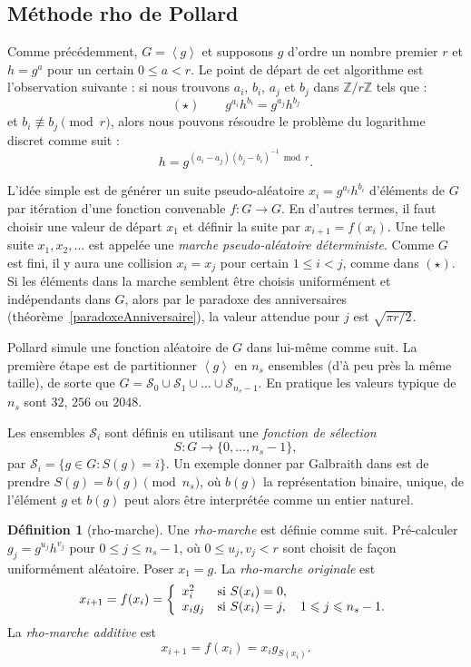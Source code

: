 \documentclass[a4paper, titlepage]{article}
\theoremstyle{definition}
\newtheorem{defi}[theo]{Définition}
\theoremstyle{remark}
\def\Z{\mathbb Z}
\def\gen #1{\left\langle#1\right\rangle}
\begin{document}
\subsection{Méthode rho de Pollard}

Comme précédemment, $G = \gen{g}$ et supposons $g$ d'ordre un nombre premier $r$ et $h = g^a$ pour un certain $0 \leqslant a < r$. Le point de départ de cet algorithme est l'observation suivante : si nous trouvons $a_i$, $b_i$, $a_j$ et $b_j$ dans $\Z/r\Z$ tels que :
$$(\star) \qquad g^{a_i}h^{b_i} = g^{a_j}h^{b_j}$$
et $b_i \not\equiv b_j \pmod{r}$, alors nous pouvons résoudre le problème du logarithme discret comme suit : $$h = g^{(a_i-a_j)(b_j-b_i)^{-1}\bmod{r}}.$$

L'idée simple est de générer un suite pseudo-aléatoire $x_i = g^{a_i}h^{b_i}$ d'éléments de $G$ par itération d'une fonction convenable $f:G \rightarrow  G$. En d'autres termes, il faut choisir une valeur de départ $x_1$ et définir la suite par $x_{i+1}=f({x_i})$. Une telle suite $x_1, x_2, \dots$ est appelée une \textit{marche pseudo-aléatoire déterministe}. Comme $G$ est fini, il y aura une collision $x_i = x_j$ pour certain $1 \leqslant i < j$, comme dans $(\star)$. Si les éléments dans la marche semblent être choisis uniformément et indépendants dans $G$, alors par le paradoxe des anniversaires (théorème~\ref{paradoxeAnniversaire}), la valeur attendue pour $j$ est $\sqrt{\pi r / 2}$.

Pollard simule une fonction aléatoire de $G$ dans lui-même comme suit. La première étape est de partitionner $\gen{g}$ en $n_s$ ensembles (d’à peu près la même taille), de sorte que $G = \mathcal{S}_0 \cup  \mathcal{S}_1 \cup \dots \cup \mathcal{S}_{n_s-1}$. En pratique les valeurs typique de $n_s$ sont $32$, $256$ ou $2048$.

Les ensembles $\mathcal{S}_i$ sont définis en utilisant une \textit{fonction de sélection} $$S : G \rightarrow \{0, \dots, n_s -1 \},$$ par $\mathcal{S}_i = \{g \in G : S(g) = i\}$. Un exemple donner par Galbraith dans \cite{galbraith2012} est de prendre $S(g) = b(g) \pmod{n_s}$, où $b(g)$ la représentation binaire, unique, de l'élément $g$ et $b(g)$ peut alors être interprétée comme un entier naturel.

\begin{defi}[rho-marche]
Une \textit{rho-marche} est définie comme suit. Pré-calculer $g_j = g^{u_j}h^{v_j}$ pour $0 \leqslant j \leqslant n_s -1$, où $ 0\leqslant u_j, v_j < r$ sont choisit de façon uniformément aléatoire. Poser $x_1 = g$. La \textit{rho-marche originale} est 
$$x_{i+1} = f(x_i) = \left\{ \begin{array}{l l}
x_i^2 & \text{si } S(x_i) = 0,\\
x_ig_j & \text{si } S(x_i) = j, \quad 1 \leqslant j \leqslant n_s-1.
\end{array} \right.$$
La \textit{rho-marche additive} est
$$x_{i+1} = f(x_i) = x_ig_{S(x_i)}.$$
\end{defi}
\end{document}
